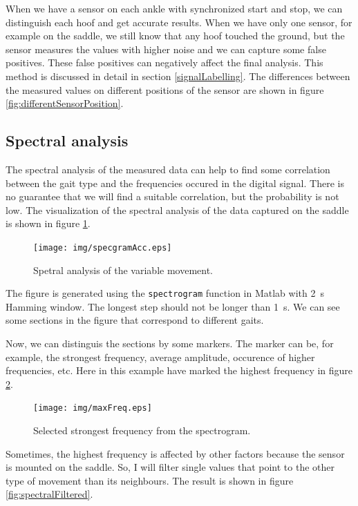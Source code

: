 When we have a sensor on each ankle with synchronized start and stop, we can distinguish each hoof and get accurate results. When we have only one sensor, for example on the saddle, we still know that any hoof touched the ground, but the sensor measures the values with higher noise and we can capture some false positives. These false positives can negatively affect the final analysis. This method is discussed in detail in section \ref{signalLabelling}. The differences between the measured values on different positions of the sensor are shown in figure \ref{fig:differentSensorPosition}.

\subsection{Spectral analysis}
\label{spectralAnalysis}
The spectral analysis of the measured data can help to find some correlation between the gait type and the frequencies occured in the digital signal. There is no guarantee that we will find a suitable correlation, but the probability is not low. The visualization of the spectral analysis of the data captured on the saddle is shown in figure \ref{fig:spectralAnalysis}.

\begin{figure}
	\centering
	\label{fig:spectralAnalysis}
	\caption{Spetral analysis of the variable movement.}
	\texttt{[image: img/specgramAcc.eps]}
\end{figure}

The figure is generated using the \texttt{spectrogram} function in Matlab with \SI{2}{s} Hamming window. The longest step should not be longer than \SI{1}{s}. We can see some sections in the figure that correspond to different gaits.

Now, we can distinguis the sections by some markers. The marker can be, for example, the strongest frequency, average amplitude, occurence of higher frequencies, etc. Here in this example have marked the highest frequency in figure \ref{fig:spectralHighest}.

\begin{figure}
	\centering
	\label{fig:spectralHighest}
	\caption{Selected strongest frequency from the spectrogram.}
	\texttt{[image: img/maxFreq.eps]}
\end{figure}

Sometimes, the highest frequency is affected by other factors because the sensor is mounted on the saddle. So, I will filter single values that point to the other type of movement than its neighbours. The result is shown in figure \ref{fig:spectralFiltered}.

